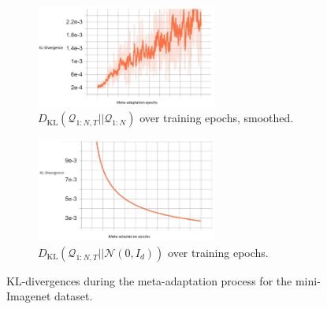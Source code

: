 \documentclass{article} %
\theoremstyle{definition}
\begin{document}
\begin{figure}[h!]
	\centering
	\begin{subfigure}[b]{0.45\textwidth}
		\centering
		\includegraphics[width=0.65\textwidth]{kl_adaptive}
		\caption{$D_{\mathrm{KL}}(\mathcal{Q}_{1:N,T}||\mathcal{Q}_{1:N})$ over training epochs, smoothed.}
	\end{subfigure}
	\hfill
	\begin{subfigure}[b]{0.45\textwidth}
		\centering
		\includegraphics[width=0.65\textwidth]{kl_normal}
		\caption{$D_{\mathrm{KL}}(\mathcal{Q}_{1:N,T}||\mathcal{N}(0,I_d))$ over training epochs.}	 	
	\end{subfigure}
	\hfill
	\caption{KL-divergences during the meta-adaptation process for the mini-Imagenet dataset.}	 
	\label{fig:results-kls}
\end{figure}
\end{document}
